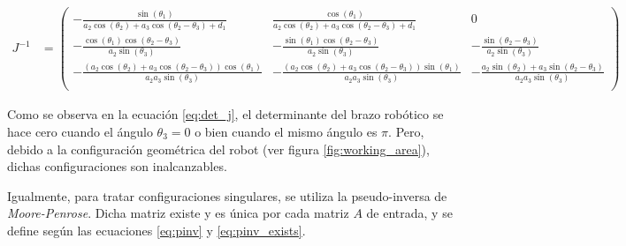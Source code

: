 \documentclass[a4paper,12pt]{article}
\begin{document}
{\small\begin{align}
    J^{-1} & =
    \begin{pmatrix}
        - \frac{\sin{\left(\theta_{1} \right)}}{a_{2} \cos{\left(\theta_{2} \right)} + a_{3} \cos{\left(\theta_{2} - \theta_{3} \right)} + d_{1}}                                                 & \frac{\cos{\left(\theta_{1} \right)}}{a_{2} \cos{\left(\theta_{2} \right)} + a_{3} \cos{\left(\theta_{2} - \theta_{3} \right)} + d_{1}}                                                   & 0                                                                                                                                             \\
        - \frac{\cos{\left(\theta_{1} \right)} \cos{\left(\theta_{2} - \theta_{3} \right)}}{a_{2} \sin{\left(\theta_{3} \right)}}                                                                 & - \frac{\sin{\left(\theta_{1} \right)} \cos{\left(\theta_{2} - \theta_{3} \right)}}{a_{2} \sin{\left(\theta_{3} \right)}}                                                                 & - \frac{\sin{\left(\theta_{2} - \theta_{3} \right)}}{a_{2} \sin{\left(\theta_{3} \right)}}                                                    \\
        - \frac{\left(a_{2} \cos{\left(\theta_{2} \right)} + a_{3} \cos{\left(\theta_{2} - \theta_{3} \right)}\right) \cos{\left(\theta_{1} \right)}}{a_{2} a_{3} \sin{\left(\theta_{3} \right)}} & - \frac{\left(a_{2} \cos{\left(\theta_{2} \right)} + a_{3} \cos{\left(\theta_{2} - \theta_{3} \right)}\right) \sin{\left(\theta_{1} \right)}}{a_{2} a_{3} \sin{\left(\theta_{3} \right)}} & - \frac{a_{2} \sin{\left(\theta_{2} \right)} + a_{3} \sin{\left(\theta_{2} - \theta_{3} \right)}}{a_{2} a_{3} \sin{\left(\theta_{3} \right)}} \\
    \end{pmatrix}
\end{align}}

Como se observa en la ecuación \ref{eq:det_j}, el determinante del brazo robótico
se hace cero cuando el ángulo $\theta_3 = 0$ o bien cuando el mismo ángulo es $\pi$.
Pero, debido a la configuración geométrica del robot (ver figura \ref{fig:working_area}),
dichas configuraciones son inalcanzables.

Igualmente, para tratar configuraciones singulares, se utiliza la pseudo-inversa de
\textit{Moore-Penrose}. Dicha matriz existe y es única por cada matriz $A$ de entrada,
y se define según las ecuaciones \ref{eq:pinv} y \ref{eq:pinv_exists}.
\end{document}
